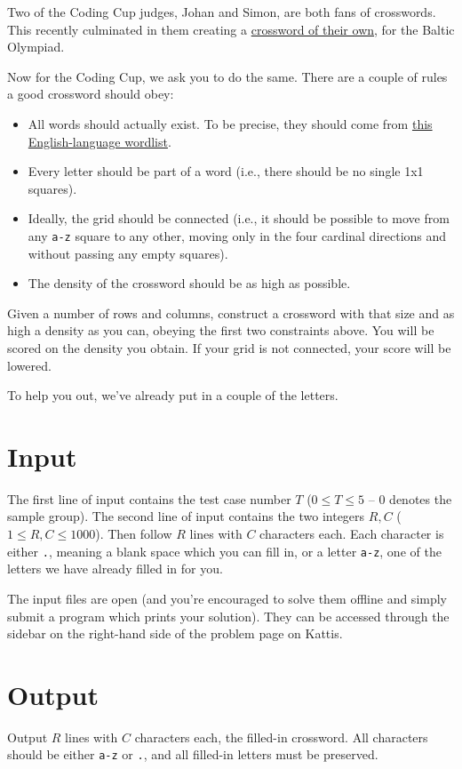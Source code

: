 Two of the Coding Cup judges, Johan and Simon, are both fans of crosswords.
This recently culminated in them creating a \href{http://boi2018.progolymp.se/day4.pdf}{crossword of their own},
for the Baltic Olympiad.

Now for the Coding Cup, we ask you to do the same. There are a couple of rules a good crossword should obey:
\begin{itemize}
  \item All words should actually exist. To be precise, they should come from \href{http://codingcup.se/2018/wordlist.txt}{this English-language wordlist}.
  \item Every letter should be part of a word (i.e., there should be no single 1x1 squares).
  \item Ideally, the grid should be connected (i.e., it should be possible to move from any \texttt{a-z} square to any other,
    moving only in the four cardinal directions and without passing any empty squares).
  \item The density of the crossword should be as high as possible.
\end{itemize}

Given a number of rows and columns, construct a crossword with that size and as high a
density as you can, obeying the first two constraints above.
You will be scored on the density you obtain.
If your grid is not connected, your score will be lowered.

To help you out, we've already put in a couple of the letters.

\section*{Input}
The first line of input contains the test case number $T$ ($0 \le T \le 5$ -- $0$ denotes the sample group).
The second line of input contains the two integers $R, C$ ($1 \le R, C \le 1000$).
Then follow $R$ lines with $C$ characters each. Each character is either \texttt{.},
meaning a blank space which you can fill in, or a letter \texttt{a-z}, one of the
letters we have already filled in for you.

The input files are open (and you're encouraged to solve them offline and simply
submit a program which prints your solution). They can be accessed through the
sidebar on the right-hand side of the problem page on Kattis.

\section*{Output}
Output $R$ lines with $C$ characters each, the filled-in crossword.
All characters should be either \texttt{a-z} or \texttt{.}, and all filled-in
letters must be preserved.

